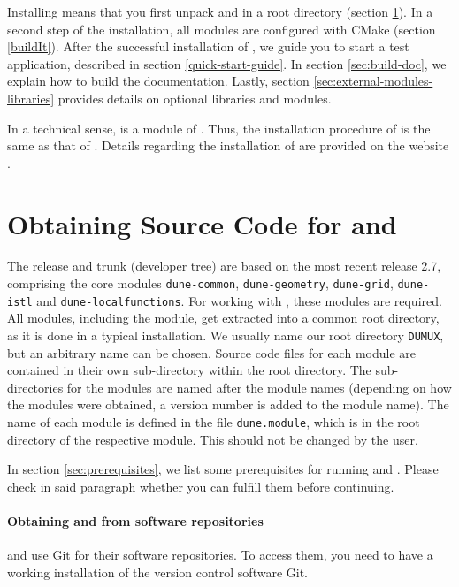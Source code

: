 Installing \Dumux means that you first unpack \Dune and \Dumux in a root directory
(section \ref{sc:ObtainingSourceCode}).
In a second step of the installation, all modules are configured with CMake
(section \ref{buildIt}).
After the successful installation of \Dumux, we guide you to start a test application,
described in section \ref{quick-start-guide}.
In section \ref{sec:build-doc}, we explain how to build the \Dumux documentation.
Lastly, section \ref{sec:external-modules-libraries} provides details on optional libraries and modules.

In a technical sense, \Dumux is a module of \Dune.
Thus, the installation procedure of \Dumux is the same as that of \Dune.
Details regarding the installation of \Dune are provided on the \Dune website \cite{DUNE-HP}.


\section{Obtaining Source Code for \Dune and \Dumux}
\label{sc:ObtainingSourceCode}
The \Dumux release and trunk (developer tree) are based on the most recent
\Dune release 2.7, comprising the core modules \texttt{dune-common}, \texttt{dune-geometry},
\texttt{dune-grid}, \texttt{dune-istl} and \texttt{dune-localfunctions}.
For working with \Dumux, these modules are required.
All \Dune modules, including the \Dumux module, get extracted into a common root directory, as it
is done in a typical \Dune installation.
We usually name our root directory \texttt{DUMUX}, but an arbitrary name can be chosen.
Source code files for each \Dune module are contained in their own sub-directory within the root directory.
The sub-directories for the modules are named after the module names (depending on how
the modules were obtained, a version number is added to the module name).
The name of each \Dune module is defined in the file \texttt{dune.module}, which is
in the root directory of the respective module. This should not be changed by the user.

In section \ref{sec:prerequisites}, we list some prerequisites for running \Dune and \Dumux.
Please check in said paragraph whether you can fulfill them before continuing.

\paragraph{Obtaining \Dune and \Dumux from software repositories}
\Dune and \Dumux use Git for their software repositories. To access them,
you need to have a working installation of the version control software Git.

